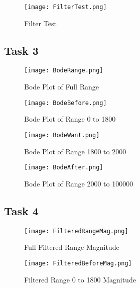 \documentclass[12pt]{report}
\begin{document}
\begin{figure}[H]
\begin{center}
\caption{Filter Test}
\texttt{[image: FilterTest.png]}
\end{center}
\end{figure}

\subsection{Task 3}
\begin{figure}[H]
\begin{center}
\caption{Bode Plot of Full Range}
\texttt{[image: BodeRange.png]}
\end{center}
\end{figure}

\begin{figure}[H]
\begin{center}
\caption{Bode Plot of Range 0 to 1800}
\texttt{[image: BodeBefore.png]}
\end{center}
\end{figure}

\begin{figure}[H]
\begin{center}
\caption{Bode Plot of Range 1800 to 2000}
\texttt{[image: BodeWant.png]}
\end{center}
\end{figure}

\begin{figure}[H]
\begin{center}
\caption{Bode Plot of Range 2000 to 100000}
\texttt{[image: BodeAfter.png]}
\end{center}
\end{figure}

\subsection{Task 4}
\begin{figure}[H]
\begin{center}
\caption{Full Filtered Range Magnitude}
\texttt{[image: FilteredRangeMag.png]}
\end{center}
\end{figure}

\begin{figure}[H]
\begin{center}
\caption{Filtered Range 0 to 1800 Magnitude}
\texttt{[image: FilteredBeforeMag.png]}
\end{center}
\end{figure}
\end{document}
